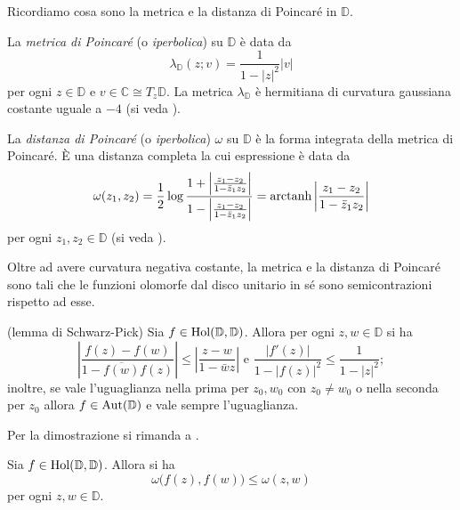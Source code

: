 Ricordiamo cosa sono la metrica e la distanza di Poincaré in $\mathbb{D}$.

\begin{defn}
    La \textit{metrica di Poincaré} (o \textit{iperbolica}) su $\mathbb{D}$ è data da
    \begin{equation}
        \lambda_{\mathbb{D}}(z;v)=\frac{1}{1-|z|^2}|v|
    \end{equation}
    per ogni $z \in \mathbb{D}$ e $v \in \mathbb{C}\cong T_z\mathbb{D}$. La metrica $\lambda_{\mathbb{D}}$ è hermitiana di curvatura gaussiana costante uguale a $-4$ (si veda \cite[Section 1-5]{Ah}).
\end{defn}

\begin{defn} \label{poidist}
    La \textit{distanza di Poincaré} (o \textit{iperbolica}) $\omega$ su $\mathbb{D}$ è la forma integrata della metrica di Poincaré. È una distanza completa la cui espressione è data da
    \begin{equation}
        \omega(z_1,z_2)=\frac{1}{2}\log{\frac{1+\left|\frac{z_1-z_2}{1-\bar{z}_1z_2}\right|}{1-\left|\frac{z_1-z_2}{1-\bar{z}_1z_2}\right|}}=\text{arctanh\,}{\left|\frac{z_1-z_2}{1-\bar{z}_1z_2}\right|}
    \end{equation}
    per ogni $z_1,z_2 \in \mathbb{D}$ (si veda \cite[Section 1-1]{Ah}).
\end{defn}

Oltre ad avere curvatura negativa costante, la metrica e la distanza di Poincaré sono tali che le funzioni olomorfe dal disco unitario in sé sono semicontrazioni rispetto ad esse.

\begin{lm}
    (lemma di Schwarz-Pick) Sia $f \in \text{\normalfont{Hol}}(\mathbb{D},\mathbb{D})$.
    Allora per ogni $z, w \in \mathbb{D}$ si ha
    $$\left|\frac{f(z)-f(w)}{1-\overline{f(w)}f(z)}\right| \le \left|\frac{z-w}{1-\bar{w}z}\right| \text{ e } \frac{|f'(z)|}{1-|f(z)|^2} \le \frac{1}{1-|z|^2};$$
    inoltre, se vale l'uguaglianza nella prima per $z_0,w_0$ con $z_0\not=w_0$ o nella seconda per $z_0$ allora $f\in\textnormal{Aut}(\mathbb{D})$ e vale sempre l'uguaglianza.
\end{lm}

Per la dimostrazione si rimanda a \cite[Chapter I, Theorem 1.1]{Ko2}.

\begin{cor}
    Sia $f\in\textnormal{Hol}(\mathbb{D},\mathbb{D})$. Allora si ha
    \begin{equation}
        \omega\big(f(z),f(w)\big) \le \omega(z,w)
    \end{equation}
    per ogni $z,w\in\mathbb{D}$.
\end{cor}
  
